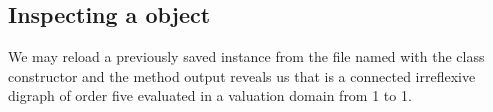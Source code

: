 \documentclass[a4paper,10pt,english]{sphinxhowto}
\begin{document}
\begin{sphinxVerbatim}[commandchars=\\\{\},numbers=left,firstnumber=1,stepnumber=1]
     
\end{sphinxVerbatim}


\subsection{Inspecting a  object}
\label{\detokenize{tutorial:inspecting-a-digraph-object}}
We may reload a previously saved  instance from the file named  with the  class constructor and the  method output reveals us that  is a connected irreflexive digraph of order five evaluated in a valuation domain from \sphinxhyphen{}1 to 1.
\end{document}
